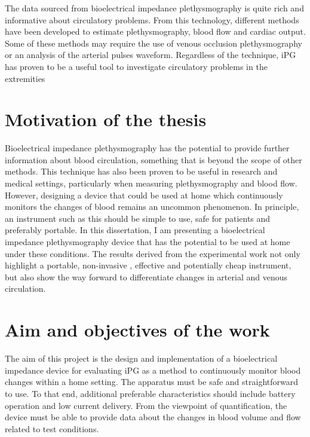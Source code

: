 The data sourced from bioelectrical impedance plethysmography is quite rich and informative about circulatory problems. From this technology, different methods have been developed to estimate plethysmography, blood flow and cardiac output. Some of these methods may require the use of venous occlusion plethysmography or an analysis of the arterial pulses waveform. Regardless of the technique, iPG has proven to be a useful tool to investigate circulatory problems in the extremities \cite{bera2014bioelectrical, nyboer1974blood, mohapatra1979measurement, kyle2004bioelectrical, costeloe1980continuous, yamakoshi1980limb, porter1985measurement, corciova2011peripheral}

\section{Motivation of the thesis}
Bioelectrical impedance plethysmography has the potential to provide further information about blood circulation, something that is beyond the scope of  other methods. This technique has also been proven to be useful in research and medical settings, particularly when measuring plethysmography and blood flow. However, designing a device that could be used at home which continuously monitors the changes of blood remains an uncommon phenomenon. In principle, an instrument such as this should be simple to use, safe for patients and preferably portable. In this dissertation, I am presenting a bioelectrical impedance plethysmography device that has the potential to be used at home under these conditions. The results derived from the experimental work not only highlight a portable, non-invasive , effective and potentially cheap instrument, but also show the way forward to differentiate changes in arterial and venous circulation. 

\section{Aim and objectives of the work}
The aim of this project is the design and implementation of a bioelectrical impedance device for evaluating iPG as a method to continuously monitor blood changes within a home setting. The apparatus must be safe and straightforward to use. To that end, additional preferable characteristics should include battery operation and low current delivery. From the viewpoint of quantification, the device must be able to provide data about the changes in blood volume and flow related to test conditions. 

